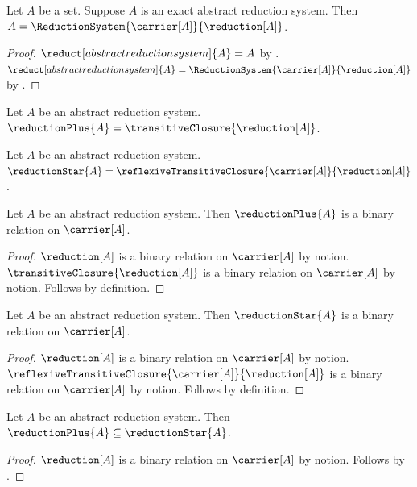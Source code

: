 \begin{theorem}\label{exact_reduction_system_eta}
    Let $A$ be a set.
    Suppose $A$ is an exact abstract reduction system.
    Then $A=\ReductionSystem{\carrier[A]}{\reduction[A]}$.
\end{theorem}
\begin{proof}
    $\reduct[abstract reduction system]{A}=A$
        by .
    $\reduct[abstract reduction system]{A}=
        \ReductionSystem{\carrier[A]}{\reduction[A]}$
        by .
\end{proof}

\begin{definition}\label{reduction_plus}
    Let $A$ be an abstract reduction system.
    $\reductionPlus{A}=\transitiveClosure{\reduction[A]}$.
\end{definition}

\begin{definition}\label{reduction_star}
    Let $A$ be an abstract reduction system.
    $\reductionStar{A}=
        \reflexiveTransitiveClosure{\carrier[A]}{\reduction[A]}$.
\end{definition}

\begin{classification}\label{reduction_plus_type}
    Let $A$ be an abstract reduction system.
    Then $\reductionPlus{A}$ is a binary relation on $\carrier[A]$.
\end{classification}
\begin{proof}
    $\reduction[A]$ is a binary relation on $\carrier[A]$ by notion.
    $\transitiveClosure{\reduction[A]}$ is a binary relation on $\carrier[A]$
        by notion.
    Follows by definition.
\end{proof}

\begin{classification}\label{reduction_star_type}
    Let $A$ be an abstract reduction system.
    Then $\reductionStar{A}$ is a binary relation on $\carrier[A]$.
\end{classification}
\begin{proof}
    $\reduction[A]$ is a binary relation on $\carrier[A]$ by notion.
    $\reflexiveTransitiveClosure{\carrier[A]}{\reduction[A]}$ is a binary
        relation on $\carrier[A]$ by notion.
    Follows by definition.
\end{proof}

\begin{proposition}\label{reduction_plus_subseteq_reduction_star}
    Let $A$ be an abstract reduction system.
    Then $\reductionPlus{A}\subseteq\reductionStar{A}$.
\end{proposition}
\begin{proof}
    $\reduction[A]$ is a binary relation on $\carrier[A]$ by notion.
    Follows by .
\end{proof}

